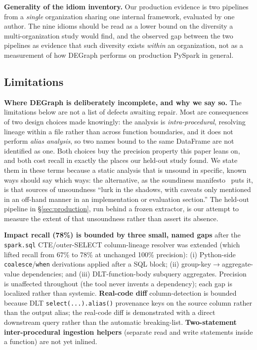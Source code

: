 \documentclass[11pt]{article}
\newcommand{\code}[1]{\texttt{#1}}
\begin{document}
\textbf{Generality of the idiom inventory.} Our production evidence is two pipelines
from a \emph{single} organization sharing one internal framework, evaluated by one
author. The nine idioms should be read as a lower bound on the diversity a
multi-organization study would find, and the observed gap between the two pipelines
as evidence that such diversity exists \emph{within} an organization, not as a
measurement of how DEGraph performs on production PySpark in general.

\subsection{Limitations}
\textbf{Where DEGraph is deliberately incomplete, and why we say so.} The limitations below
are not a list of defects awaiting repair. Most are consequences of two design choices made
knowingly: the analysis is \emph{intra-procedural}, resolving lineage within a file rather
than across function boundaries, and it does not perform \emph{alias analysis}, so two names
bound to the same DataFrame are not identified as one. Both choices buy the precision
property this paper leans on, and both cost recall in exactly the places our held-out study
found. We state them in these terms because a static analysis that is unsound in specific,
known ways should say which ways: the alternative, as the soundiness
manifesto~\cite{soundiness} puts it, is that sources of unsoundness ``lurk in the shadows,
with caveats only mentioned in an off-hand manner in an implementation or evaluation
section.'' The held-out pipeline in \S\ref{sec:production}, run behind a frozen extractor, is
our attempt to measure the extent of that unsoundness rather than assert its absence.

\textbf{Impact recall (78\%) is bounded by three small, named gaps} after the
\code{spark.sql} CTE/outer-SELECT column-lineage resolver was extended (which lifted
recall from 67\% to 78\% at unchanged 100\% precision): (i) Python-side
\code{coalesce}/\code{when} derivations applied after a SQL block; (ii)
group-key$\rightarrow$aggregate-value dependencies; and (iii) DLT-function-body
subquery aggregates. Precision is unaffected throughout (the tool never invents a
dependency); each gap is localized rather than systemic.
\textbf{Real-code diff} column-detection is bounded because DLT
\code{select(.\allowbreak .\allowbreak .\allowbreak ).\allowbreak alias()} provenance keys on the source column rather than the
output alias; the real-code diff is demonstrated with a direct downstream query
rather than the automatic breaking-list. \textbf{Two-statement inter-procedural
ingestion helpers} (separate read and write statements inside a function) are not
yet inlined.
\end{document}

